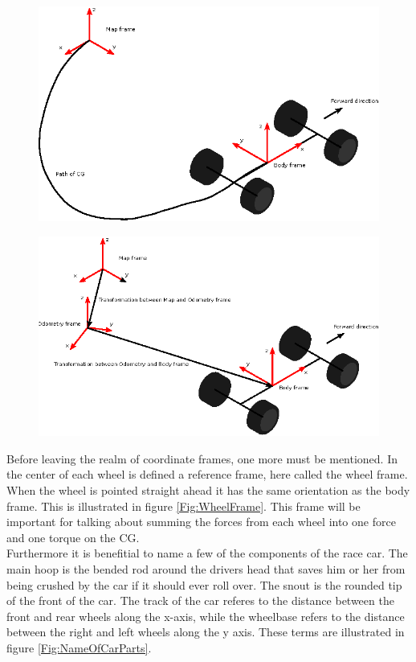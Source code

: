 \begin{figure}
    \centering
    \includegraphics[width=0.5\linewidth]{0_Images/2_Introduction/MapAndBodyFrames.eps}
    \label{Fig:MapAndBodyFrames}
\end{figure}

\begin{figure}
    \centering
    \includegraphics[width=0.5\linewidth]{0_Images/2_Introduction/MapOdomAndBodyFrames.eps}
    \label{Fig:MapOdomAndBodyFrames}
\end{figure}

Before leaving the realm of coordinate frames, one more must be mentioned. In the center of each wheel is defined a reference frame, here called the wheel frame. When the wheel is pointed straight ahead it has the same orientation as the body frame. This is illustrated in figure \ref{Fig:WheelFrame}. This frame will be important for talking about summing the forces from each wheel into one force and one torque on the CG. \\

Furthermore it is benefitial to name a few of the components of the race car. The main hoop is the bended rod around the drivers head that saves him or her from being crushed by the car if it should ever roll over. The snout is the rounded tip of the front of the car. The track of the car referes to the distance between the front and rear wheels along the x-axis, while the wheelbase refers to the distance between the right and left wheels along the y axis. These terms are illustrated in figure \ref{Fig:NameOfCarParts}.


